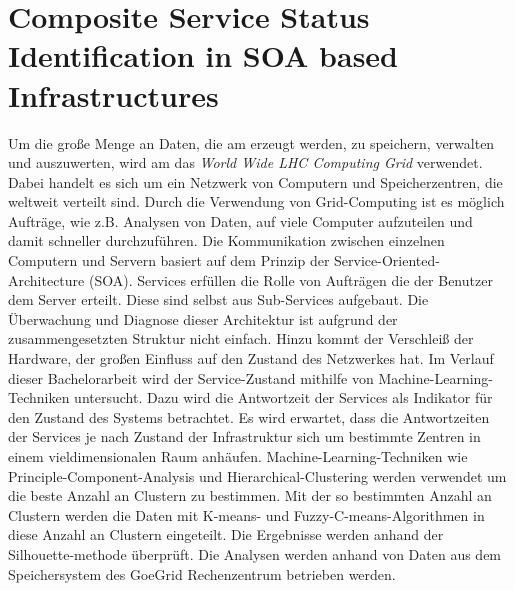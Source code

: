 \section{Composite Service Status Identification in SOA based Infrastructures}
Um die große Menge an Daten, die am \lhc erzeugt werden, zu speichern, verwalten und auszuwerten, wird am \cern das \emph{World Wide LHC Computing Grid} verwendet. Dabei handelt es sich um ein Netzwerk von Computern und Speicherzentren, die weltweit verteilt sind. Durch die Verwendung von Grid-Computing ist es möglich Aufträge, wie z.B. Analysen von Daten, auf viele Computer aufzuteilen und damit schneller durchzuführen. Die Kommunikation zwischen einzelnen Computern und Servern basiert auf dem Prinzip der Service-Oriented-Architecture (SOA). Services erfüllen die Rolle von Aufträgen die der Benutzer dem Server erteilt. Diese sind selbst aus Sub-Services aufgebaut. Die Überwachung und Diagnose dieser Architektur ist aufgrund der zusammengesetzten Struktur nicht einfach. Hinzu kommt der Verschleiß der Hardware, der großen Einfluss auf den Zustand des Netzwerkes hat. Im Verlauf dieser Bachelorarbeit wird der Service-Zustand mithilfe von Machine-Learning-Techniken untersucht. Dazu wird die Antwortzeit der Services als Indikator für den Zustand des Systems betrachtet. Es wird erwartet, dass die Antwortzeiten der Services je nach Zustand der Infrastruktur sich um bestimmte Zentren in einem vieldimensionalen Raum anhäufen. Machine-Learning-Techniken wie Principle-Component-Analysis und Hierarchical-Clustering werden verwendet um die beste Anzahl an Clustern zu bestimmen. 
Mit der so bestimmten Anzahl an Clustern werden die Daten mit K-means- und Fuzzy-C-means-Algorithmen in diese Anzahl an Clustern eingeteilt. Die Ergebnisse werden anhand der Silhouette-methode überprüft.
Die Analysen werden anhand von Daten aus dem Speichersystem des GoeGrid Rechenzentrum betrieben werden.